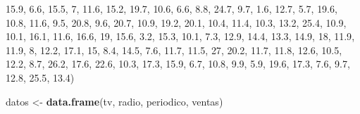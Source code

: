 \documentclass[]{book}
\newenvironment{Shaded}{\begin{snugshade}}{\end{snugshade}}
\newcommand{\KeywordTok}[1]{\textcolor[rgb]{0.13,0.29,0.53}{\textbf{#1}}}
\newcommand{\DecValTok}[1]{\textcolor[rgb]{0.00,0.00,0.81}{#1}}
\newcommand{\FloatTok}[1]{\textcolor[rgb]{0.00,0.00,0.81}{#1}}
\newcommand{\StringTok}[1]{\textcolor[rgb]{0.31,0.60,0.02}{#1}}
\newcommand{\NormalTok}[1]{#1}
\begin{document}
\begin{Shaded}
\begin{Highlighting}[]
    \FloatTok{15.9}\NormalTok{, }\FloatTok{6.6}\NormalTok{, }\FloatTok{15.5}\NormalTok{, }\DecValTok{7}\NormalTok{, }\FloatTok{11.6}\NormalTok{, }\FloatTok{15.2}\NormalTok{, }\FloatTok{19.7}\NormalTok{, }\FloatTok{10.6}\NormalTok{, }\FloatTok{6.6}\NormalTok{, }\FloatTok{8.8}\NormalTok{, }\FloatTok{24.7}\NormalTok{, }\FloatTok{9.7}\NormalTok{, }\FloatTok{1.6}\NormalTok{, }\FloatTok{12.7}\NormalTok{, }
    \FloatTok{5.7}\NormalTok{, }\FloatTok{19.6}\NormalTok{, }\FloatTok{10.8}\NormalTok{, }\FloatTok{11.6}\NormalTok{, }\FloatTok{9.5}\NormalTok{, }\FloatTok{20.8}\NormalTok{, }\FloatTok{9.6}\NormalTok{, }\FloatTok{20.7}\NormalTok{, }\FloatTok{10.9}\NormalTok{, }\FloatTok{19.2}\NormalTok{, }\FloatTok{20.1}\NormalTok{, }\FloatTok{10.4}\NormalTok{, }\FloatTok{11.4}\NormalTok{, }
    \FloatTok{10.3}\NormalTok{, }\FloatTok{13.2}\NormalTok{, }\FloatTok{25.4}\NormalTok{, }\FloatTok{10.9}\NormalTok{, }\FloatTok{10.1}\NormalTok{, }\FloatTok{16.1}\NormalTok{, }\FloatTok{11.6}\NormalTok{, }\FloatTok{16.6}\NormalTok{, }\DecValTok{19}\NormalTok{, }\FloatTok{15.6}\NormalTok{, }\FloatTok{3.2}\NormalTok{, }\FloatTok{15.3}\NormalTok{, }\FloatTok{10.1}\NormalTok{, }
    \FloatTok{7.3}\NormalTok{, }\FloatTok{12.9}\NormalTok{, }\FloatTok{14.4}\NormalTok{, }\FloatTok{13.3}\NormalTok{, }\FloatTok{14.9}\NormalTok{, }\DecValTok{18}\NormalTok{, }\FloatTok{11.9}\NormalTok{, }\FloatTok{11.9}\NormalTok{, }\DecValTok{8}\NormalTok{, }\FloatTok{12.2}\NormalTok{, }\FloatTok{17.1}\NormalTok{, }\DecValTok{15}\NormalTok{, }\FloatTok{8.4}\NormalTok{, }\FloatTok{14.5}\NormalTok{, }
    \FloatTok{7.6}\NormalTok{, }\FloatTok{11.7}\NormalTok{, }\FloatTok{11.5}\NormalTok{, }\DecValTok{27}\NormalTok{, }\FloatTok{20.2}\NormalTok{, }\FloatTok{11.7}\NormalTok{, }\FloatTok{11.8}\NormalTok{, }\FloatTok{12.6}\NormalTok{, }\FloatTok{10.5}\NormalTok{, }\FloatTok{12.2}\NormalTok{, }\FloatTok{8.7}\NormalTok{, }\FloatTok{26.2}\NormalTok{, }\FloatTok{17.6}\NormalTok{, }
    \FloatTok{22.6}\NormalTok{, }\FloatTok{10.3}\NormalTok{, }\FloatTok{17.3}\NormalTok{, }\FloatTok{15.9}\NormalTok{, }\FloatTok{6.7}\NormalTok{, }\FloatTok{10.8}\NormalTok{, }\FloatTok{9.9}\NormalTok{, }\FloatTok{5.9}\NormalTok{, }\FloatTok{19.6}\NormalTok{, }\FloatTok{17.3}\NormalTok{, }\FloatTok{7.6}\NormalTok{, }\FloatTok{9.7}\NormalTok{, }\FloatTok{12.8}\NormalTok{, }
    \FloatTok{25.5}\NormalTok{, }\FloatTok{13.4}\NormalTok{)}

\NormalTok{datos <-}\StringTok{ }\KeywordTok{data.frame}\NormalTok{(tv, radio, periodico, ventas)}
\end{Highlighting}
\end{Shaded}
\end{document}
